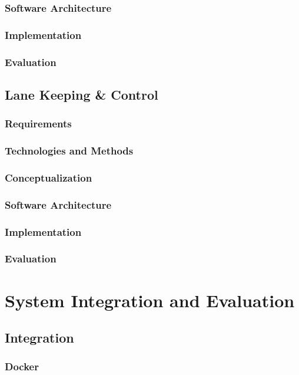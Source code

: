 \documentclass[titlepage]{article}
\begin{document}
\subsubsection{Software Architecture}
\subsubsection{Implementation}
\subsubsection{Evaluation}

\subsection{Lane Keeping \& Control}
\subsubsection{Requirements}
\subsubsection{Technologies and Methods}
\subsubsection{Conceptualization}
\subsubsection{Software Architecture}
\subsubsection{Implementation}
\subsubsection{Evaluation}

\section{System Integration and Evaluation}

\subsection{Integration}

\subsubsection{Docker}
\end{document}
